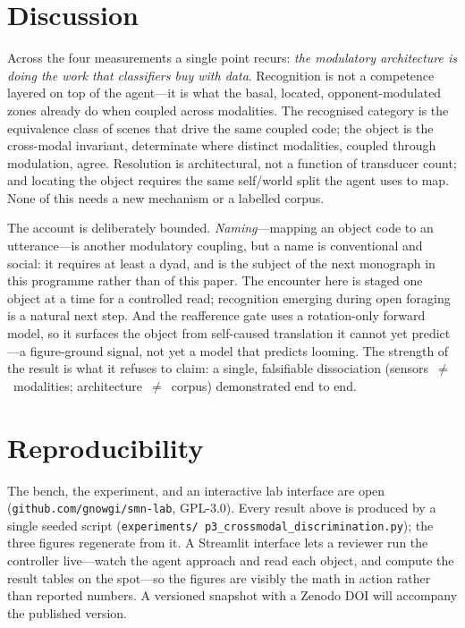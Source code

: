 \documentclass[11pt]{article}
\begin{document}
\section{Discussion}

Across the four measurements a single point recurs: \emph{the modulatory
architecture is doing the work that classifiers buy with data}. Recognition is
not a competence layered on top of the agent---it is what the basal, located,
opponent-modulated zones already do when coupled across modalities. The
recognised category is the equivalence class of scenes that drive the same
coupled code; the object is the cross-modal invariant, determinate where distinct
modalities, coupled through modulation, agree. Resolution is architectural, not a
function of transducer count; and locating the object requires the same
self/world split the agent uses to map. None of this needs a new mechanism or a
labelled corpus.

The account is deliberately bounded. \emph{Naming}---mapping an object code to an
utterance---is another modulatory coupling, but a name is conventional and
social: it requires at least a dyad, and is the subject of the next monograph in
this programme rather than of this paper. The encounter here is staged one object
at a time for a controlled read; recognition emerging during open foraging is a
natural next step. And the reafference gate uses a rotation-only forward model,
so it surfaces the object from self-caused translation it cannot yet predict---a
figure-ground signal, not yet a model that predicts looming. The strength of the
result is what it refuses to claim: a single, falsifiable dissociation
(sensors~$\neq$~modalities; architecture~$\neq$~corpus) demonstrated end to end.

\section{Reproducibility}

The bench, the experiment, and an interactive lab interface are open
(\texttt{github.com/gnowgi/smn-lab}, GPL-3.0). Every result above is produced by
a single seeded script (\texttt{experiments/\allowbreak
p3\_crossmodal\_\allowbreak discrimination.py}); the three figures regenerate from it. A Streamlit interface lets a reviewer run
the controller live---watch the agent approach and read each object, and compute
the result tables on the spot---so the figures are visibly the math in action
rather than reported numbers. A versioned snapshot with a Zenodo DOI will
accompany the published version.
\end{document}
